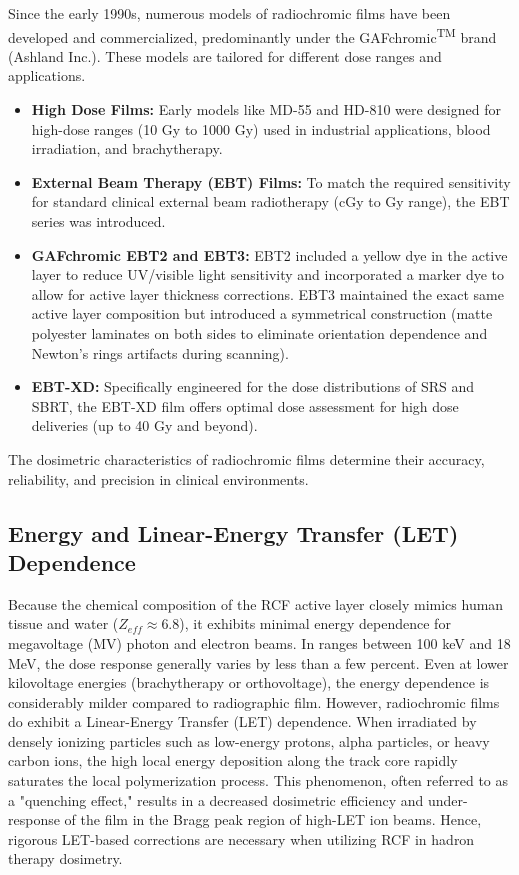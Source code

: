 Since the early 1990s, numerous models of radiochromic films have been developed and commercialized, predominantly under the GAFchromic\textsuperscript{TM} brand (Ashland Inc.). These models are tailored for different dose ranges and applications.
\begin{itemize}
    \item \textbf{High Dose Films:} Early models like MD-55 and HD-810 were designed for high-dose ranges (10 Gy to 1000 Gy) used in industrial applications, blood irradiation, and brachytherapy.
    \item \textbf{External Beam Therapy (EBT) Films:} To match the required sensitivity for standard clinical external beam radiotherapy (cGy to Gy range), the EBT series was introduced. 
    \item \textbf{GAFchromic EBT2 and EBT3:} EBT2 included a yellow dye in the active layer to reduce UV/visible light sensitivity and incorporated a marker dye to allow for active layer thickness corrections. EBT3 maintained the exact same active layer composition but introduced a symmetrical construction (matte polyester laminates on both sides to eliminate orientation dependence and Newton's rings artifacts during scanning).
    \item \textbf{EBT-XD:} Specifically engineered for the dose distributions of SRS and SBRT, the EBT-XD film offers optimal dose assessment for high dose deliveries (up to 40 Gy and beyond).
\end{itemize}

The dosimetric characteristics of radiochromic films determine their accuracy, reliability, and precision in clinical environments.

\subsection{Energy and Linear-Energy Transfer (LET) Dependence}
Because the chemical composition of the RCF active layer closely mimics human tissue and water ($Z_{eff} \approx 6.8$), it exhibits minimal energy dependence for megavoltage (MV) photon and electron beams. In ranges between 100 keV and 18 MeV, the dose response generally varies by less than a few percent. Even at lower kilovoltage energies (brachytherapy or orthovoltage), the energy dependence is considerably milder compared to radiographic film.
However, radiochromic films do exhibit a Linear-Energy Transfer (LET) dependence. When irradiated by densely ionizing particles such as low-energy protons, alpha particles, or heavy carbon ions, the high local energy deposition along the track core rapidly saturates the local polymerization process. This phenomenon, often referred to as a "quenching effect," results in a decreased dosimetric efficiency and under-response of the film in the Bragg peak region of high-LET ion beams. Hence, rigorous LET-based corrections are necessary when utilizing RCF in hadron therapy dosimetry.

